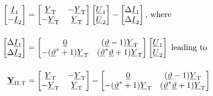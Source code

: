 \begin{align}
    \begin{bmatrix}
        \underline{I}_1 \\
        -\underline{I}_2
    \end{bmatrix} &=
    \begin{bmatrix}
        \underline{Y}_\mathrm{T} & -\underline{Y}_\mathrm{T} \\
        -\underline{Y}_\mathrm{T} & \underline{Y}_\mathrm{T}
    \end{bmatrix}
    \begin{bmatrix}
        \underline{U}_1 \\
        \underline{U}_2
    \end{bmatrix} -
    \begin{bmatrix}
        \Delta \underline{I}_1 \\
        \Delta \underline{I}_2
    \end{bmatrix}\text{, where } \notag \\[12pt]
    \begin{bmatrix}
        \Delta \underline{I}_1 \\
        \Delta \underline{I}_2
    \end{bmatrix} &=
    \begin{bmatrix}
        \underline{0} & (\underline{\vartheta}-1)\underline{Y}_\mathrm{T} \\
        -(\underline{\vartheta}^*+1)\underline{Y}_\mathrm{T} & (\underline{\vartheta}^*\underline{\vartheta}+1)\underline{Y}_\mathrm{T}
    \end{bmatrix}
    \begin{bmatrix}
        \underline{U}_1 \\
        \underline{U}_2
    \end{bmatrix} \text{ leading to } \notag \\[12pt]
    \underline{\mathrm{\textbf{Y}}}_\mathrm{\Pi,T}&= 
    \begin{bmatrix}
        \underline{Y}_\mathrm{T} & -\underline{Y}_\mathrm{T} \\
        -\underline{Y}_\mathrm{T} & \underline{Y}_\mathrm{T}
    \end{bmatrix} -
    \begin{bmatrix}
        \underline{0} & (\underline{\vartheta}-1)\underline{Y}_\mathrm{T} \\
        -(\underline{\vartheta}^*+1)\underline{Y}_\mathrm{T} & (\underline{\vartheta}^*\underline{\vartheta}+1)\underline{Y}_\mathrm{T}
    \end{bmatrix} \label{eq:admittance-oltc-2}
\end{align}

